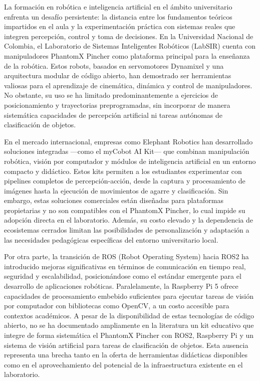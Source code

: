 La formación en robótica e inteligencia artificial en el ámbito universitario enfrenta un desafío persistente: la distancia entre los fundamentos teóricos impartidos en el aula y la experimentación práctica con sistemas reales que integren percepción, control y toma de decisiones. En la Universidad Nacional de Colombia, el Laboratorio de Sistemas Inteligentes Robóticos (LabSIR) cuenta con manipuladores PhantomX Pincher como plataforma principal para la enseñanza de la robótica. Estos robots, basados en servomotores Dynamixel y una arquitectura modular de código abierto, han demostrado ser herramientas valiosas para el aprendizaje de cinemática, dinámica y control de manipuladores. No obstante, su uso se ha limitado predominantemente a ejercicios de posicionamiento y trayectorias preprogramadas, sin incorporar de manera sistemática capacidades de percepción artificial ni tareas autónomas de clasificación de objetos.

En el mercado internacional, empresas como Elephant Robotics han desarrollado soluciones integradas ---como el myCobot AI Kit--- que combinan manipulación robótica, visión por computador y módulos de inteligencia artificial en un entorno compacto y didáctico. Estos kits permiten a los estudiantes experimentar con pipelines completos de percepción-acción, desde la captura y procesamiento de imágenes hasta la ejecución de movimientos de agarre y clasificación. Sin embargo, estas soluciones comerciales están diseñadas para plataformas propietarias y no son compatibles con el PhantomX Pincher, lo cual impide su adopción directa en el laboratorio. Además, su costo elevado y la dependencia de ecosistemas cerrados limitan las posibilidades de personalización y adaptación a las necesidades pedagógicas específicas del entorno universitario local.

Por otra parte, la transición de ROS (Robot Operating System) hacia ROS2 ha introducido mejoras significativas en términos de comunicación en tiempo real, seguridad y escalabilidad, posicionándose como el estándar emergente para el desarrollo de aplicaciones robóticas. Paralelamente, la Raspberry Pi 5 ofrece capacidades de procesamiento embebido suficientes para ejecutar tareas de visión por computador con bibliotecas como OpenCV, a un costo accesible para contextos académicos. A pesar de la disponibilidad de estas tecnologías de código abierto, no se ha documentado ampliamente en la literatura un kit educativo que integre de forma sistemática el PhantomX Pincher con ROS2, Raspberry Pi y un sistema de visión artificial para tareas de clasificación de objetos. Esta ausencia representa una brecha tanto en la oferta de herramientas didácticas disponibles como en el aprovechamiento del potencial de la infraestructura existente en el laboratorio.

